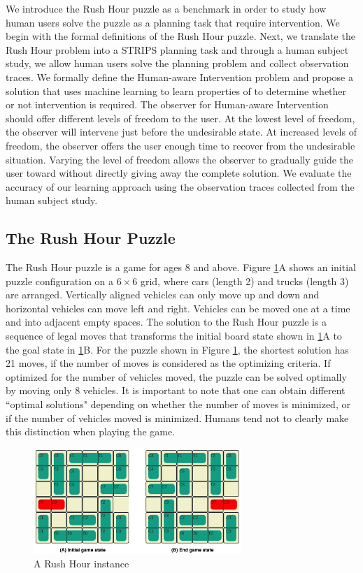 We introduce the Rush Hour puzzle as a benchmark in order to study how human users solve the puzzle as a planning task that require intervention.
We begin with the formal definitions of the Rush Hour puzzle.
Next, we translate the Rush Hour problem into a STRIPS planning task and through a human subject study, we allow human users solve the planning problem and collect observation traces.
We formally define the Human-aware Intervention problem and propose a solution that uses machine learning to learn properties of \historyDef to determine whether or not intervention is required.
The observer for Human-aware Intervention should offer different levels of freedom to the user.
At the lowest level of freedom, the observer will intervene just before the undesirable state. 
At increased levels of freedom, the observer offers the user enough time to recover from the undesirable situation.
Varying the level of freedom allows the observer to gradually guide the user toward \desired without directly giving away the complete solution.
We evaluate the accuracy of our learning approach using the observation traces collected from the human subject study.


 

\subsection{The Rush Hour Puzzle}
The Rush Hour puzzle is a game for ages 8 and above. Figure \ref{fig:game}A shows an initial puzzle configuration on a $6 \times 6$ grid, where cars (length 2) and trucks (length 3) are arranged. 
Vertically aligned vehicles can only move up and down and horizontal vehicles can move left and right. 
Vehicles can be moved one at a time and into adjacent empty spaces. The solution to the Rush Hour puzzle is a sequence of legal moves that transforms the initial board state shown in \ref{fig:game}A to the goal state in \ref{fig:game}B. 
For the puzzle shown in Figure \ref{fig:game}, the shortest solution has 21 moves, if the number of moves is considered as the optimizing criteria. 
If optimized for the number of vehicles moved, the puzzle can be solved optimally by moving only 8 vehicles. 
It is important to note that one can obtain different ``optimal solutions" depending on whether the number of moves is minimized,
or if the number of vehicles moved is minimized.
Humans tend not to clearly make this distinction when playing the game.
\begin{figure}[tpb]
  \centering
    	\includegraphics[width=0.7\textwidth]{img/figure4.jpg}
    	\caption{A Rush Hour instance}
    	\label{fig:game}
\end{figure}

